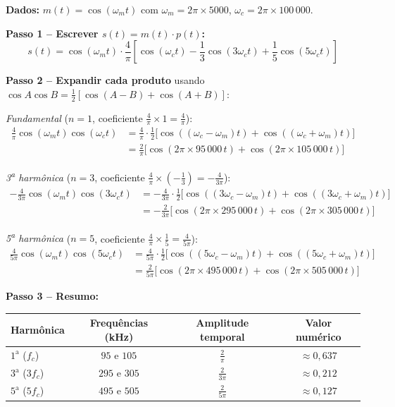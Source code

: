\documentclass[11pt,a4paper]{article}
\begin{document}
\begin{resolucao}

\textbf{Dados:} $m(t) = \cos(\omega_m t)$ com $\omega_m = 2\pi \times 5000$, \; $\omega_c = 2\pi \times 100\,000$.

\textbf{Passo 1 -- Escrever $s(t) = m(t) \cdot p(t)$:}
\[
  s(t) = \cos(\omega_m t) \cdot \frac{4}{\pi}\left[\cos(\omega_c t) - \frac{1}{3}\cos(3\omega_c t) + \frac{1}{5}\cos(5\omega_c t)\right]
\]

\textbf{Passo 2 -- Expandir cada produto} usando $\cos A \cos B = \tfrac{1}{2}[\cos(A-B) + \cos(A+B)]$:

\textit{Fundamental} ($n = 1$, coeficiente $\frac{4}{\pi} \times 1 = \frac{4}{\pi}$):
\begin{align*}
  \frac{4}{\pi}\cos(\omega_m t)\cos(\omega_c t) &= \frac{4}{\pi} \cdot \frac{1}{2}\big[\cos((\omega_c - \omega_m)t) + \cos((\omega_c + \omega_m)t)\big] \\
  &= \frac{2}{\pi}\big[\cos(2\pi \times 95\,000\,t) + \cos(2\pi \times 105\,000\,t)\big]
\end{align*}

\textit{3\textsuperscript{a} harmônica} ($n = 3$, coeficiente $\frac{4}{\pi} \times \left(-\frac{1}{3}\right) = -\frac{4}{3\pi}$):
\begin{align*}
  -\frac{4}{3\pi}\cos(\omega_m t)\cos(3\omega_c t) &= -\frac{4}{3\pi} \cdot \frac{1}{2}\big[\cos((3\omega_c - \omega_m)t) + \cos((3\omega_c + \omega_m)t)\big] \\
  &= -\frac{2}{3\pi}\big[\cos(2\pi \times 295\,000\,t) + \cos(2\pi \times 305\,000\,t)\big]
\end{align*}

\textit{5\textsuperscript{a} harmônica} ($n = 5$, coeficiente $\frac{4}{\pi} \times \frac{1}{5} = \frac{4}{5\pi}$):
\begin{align*}
  \frac{4}{5\pi}\cos(\omega_m t)\cos(5\omega_c t) &= \frac{4}{5\pi} \cdot \frac{1}{2}\big[\cos((5\omega_c - \omega_m)t) + \cos((5\omega_c + \omega_m)t)\big] \\
  &= \frac{2}{5\pi}\big[\cos(2\pi \times 495\,000\,t) + \cos(2\pi \times 505\,000\,t)\big]
\end{align*}

\textbf{Passo 3 -- Resumo:}

\begin{center}
\small
\begin{tabular}{lccc}
  \toprule
  Harmônica & Frequências (kHz) & Amplitude temporal & Valor numérico \\
  \midrule
  $1^{\text{a}}$ ($f_c$) & $95$ e $105$ & $\frac{2}{\pi}$ & $\approx 0{,}637$ \\[4pt]
  $3^{\text{a}}$ ($3f_c$) & $295$ e $305$ & $\frac{2}{3\pi}$ & $\approx 0{,}212$ \\[4pt]
  $5^{\text{a}}$ ($5f_c$) & $495$ e $505$ & $\frac{2}{5\pi}$ & $\approx 0{,}127$ \\
  \bottomrule
\end{tabular}
\end{center}
\end{resolucao}
\end{document}
